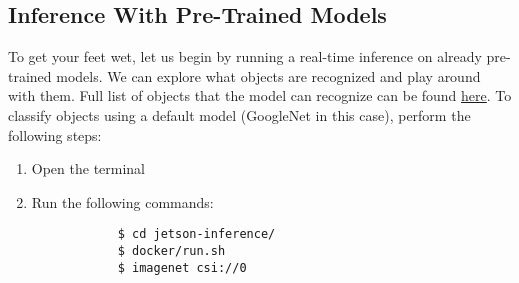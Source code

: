 \documentclass[letter, 12pt]{article}
\begin{document}
	\subsection{Inference With Pre-Trained Models}
	\noindent To get your feet wet, let us begin by running a real-time inference on already pre-trained models. We can explore what objects are recognized and play around with them. Full list of objects that the model can recognize can be found \href{https://github.com/dusty-nv/jetson-inference/blob/master/data/networks/ilsvrc12_synset_words.txt}{here}. To classify objects using a default model (GoogleNet in this case), perform the following steps:
	\begin{enumerate}
		\item Open the terminal
		\item Run the following commands:
		\begin{verbatim}
			$ cd jetson-inference/
			$ docker/run.sh
			$ imagenet csi://0
		\end{verbatim}
	\end{enumerate}
	
\end{document}
